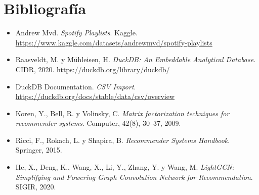 \documentclass[10pt,letterpaper]{article}
\begin{document}
\section{Bibliografía}

\begingroup
\footnotesize
\begin{itemize}
    \item Andrew Mvd. \textit{Spotify Playlists}. Kaggle. \url{https://www.kaggle.com/datasets/andrewmvd/spotify-playlists}
    \item Raasveldt, M. y Mühleisen, H. \textit{DuckDB: An Embeddable Analytical Database}. CIDR, 2020. \url{https://duckdb.org/library/duckdb/}
    \item DuckDB Documentation. \textit{CSV Import}. \url{https://duckdb.org/docs/stable/data/csv/overview}
    \item Koren, Y., Bell, R. y Volinsky, C. \textit{Matrix factorization techniques for recommender systems}. Computer, 42(8), 30--37, 2009.
    \item Ricci, F., Rokach, L. y Shapira, B. \textit{Recommender Systems Handbook}. Springer, 2015.
    \item He, X., Deng, K., Wang, X., Li, Y., Zhang, Y. y Wang, M. \textit{LightGCN: Simplifying and Powering Graph Convolution Network for Recommendation}. SIGIR, 2020.
\end{itemize}
\endgroup
\end{document}
